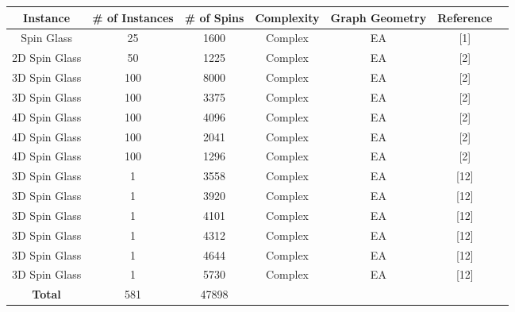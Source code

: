 \documentclass{standalone}
\begin{document}
\begin{tabular}{ |c|c|c|c|c|c|c| } 
    \hline
    \textbf{Instance} & \textbf{\# of Instances} & \textbf{\# of Spins} & \textbf{Complexity} & \textbf{Graph Geometry} & \textbf{Reference}\\ 
    \hline
    Spin Glass & 25 & 1600 & Complex & EA & [1] \\
    2D Spin Glass & 50 & 1225 & Complex & EA & [2] \\
    3D Spin Glass & 100 & 8000 & Complex & EA & [2] \\
    3D Spin Glass & 100 & 3375 & Complex & EA & [2] \\
    4D Spin Glass & 100 & 4096 & Complex & EA & [2] \\
    4D Spin Glass & 100 & 2041 & Complex & EA & [2] \\
    4D Spin Glass & 100 & 1296 & Complex & EA & [2] \\
    3D Spin Glass & 1 & 3558 & Complex & EA & [12] \\
    3D Spin Glass & 1 & 3920 & Complex & EA & [12] \\
    3D Spin Glass & 1 & 4101 & Complex & EA & [12] \\
    3D Spin Glass & 1 & 4312 & Complex & EA & [12] \\
    3D Spin Glass & 1 & 4644 & Complex & EA & [12] \\
    3D Spin Glass & 1 & 5730 & Complex & EA & [12] \\
    \hline
    \textbf{Total} & 581 & 47898 & & &\\
    \hline
\end{tabular}
\end{document}
